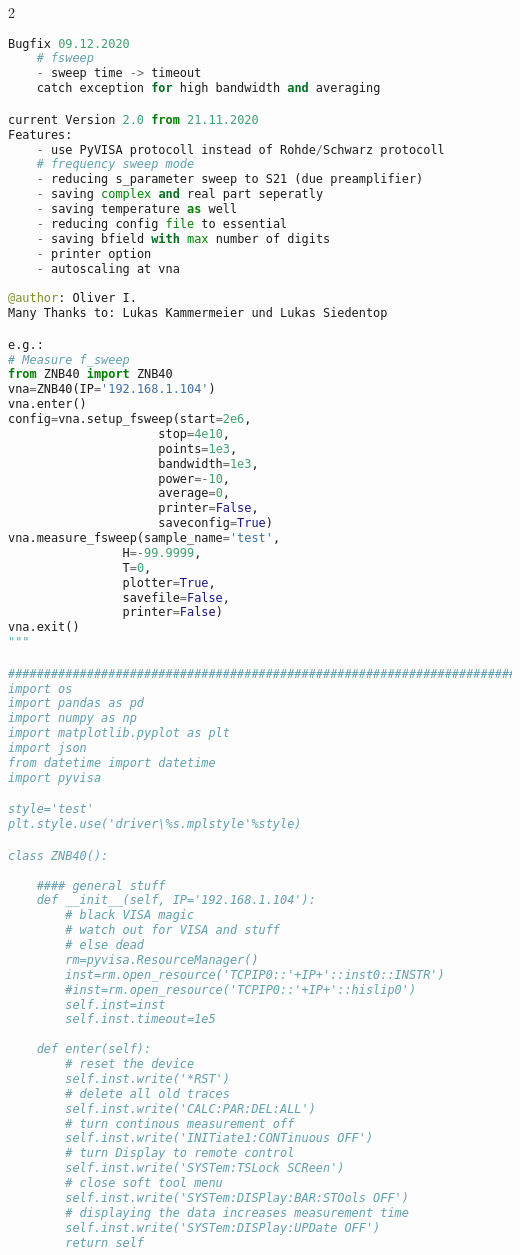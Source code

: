 \begin{landscape}
\begin{multicols}{2}
\begin{lstlisting}[language=Python]
Bugfix 09.12.2020
    # fsweep
    - sweep time -> timeout
    catch exception for high bandwidth and averaging

current Version 2.0 from 21.11.2020
Features:
    - use PyVISA protocoll instead of Rohde/Schwarz protocoll
    # frequency sweep mode
    - reducing s_parameter sweep to S21 (due preamplifier)
    - saving complex and real part seperatly
    - saving temperature as well
    - reducing config file to essential
    - saving bfield with max number of digits
    - printer option
    - autoscaling at vna
    
@author: Oliver I.
Many Thanks to: Lukas Kammermeier und Lukas Siedentop

e.g.:
# Measure f_sweep
from ZNB40 import ZNB40
vna=ZNB40(IP='192.168.1.104')
vna.enter()
config=vna.setup_fsweep(start=2e6,
                     stop=4e10,
                     points=1e3,
                     bandwidth=1e3,
                     power=-10,
                     average=0,
                     printer=False,
                     saveconfig=True)
vna.measure_fsweep(sample_name='test',
                H=-99.9999,
                T=0,
                plotter=True,
                savefile=False,
                printer=False)
vna.exit()
"""

##############################################################################
import os
import pandas as pd
import numpy as np
import matplotlib.pyplot as plt
import json
from datetime import datetime
import pyvisa

style='test'
plt.style.use('driver\%s.mplstyle'%style)

class ZNB40():
    
    #### general stuff
    def __init__(self, IP='192.168.1.104'):
        # black VISA magic
        # watch out for VISA and stuff
        # else dead
        rm=pyvisa.ResourceManager()
        inst=rm.open_resource('TCPIP0::'+IP+'::inst0::INSTR')
        #inst=rm.open_resource('TCPIP0::'+IP+'::hislip0')
        self.inst=inst
        self.inst.timeout=1e5
        
    def enter(self):
        # reset the device
        self.inst.write('*RST')
        # delete all old traces
        self.inst.write('CALC:PAR:DEL:ALL')
        # turn continous measurement off
        self.inst.write('INITiate1:CONTinuous OFF')
        # turn Display to remote control
        self.inst.write('SYSTem:TSLock SCReen')
        # close soft tool menu
        self.inst.write('SYSTem:DISPlay:BAR:STOols OFF')
        # displaying the data increases measurement time 
        self.inst.write('SYSTem:DISPlay:UPDate OFF')
        return self
    

\end{lstlisting}
\end{multicols}
\end{landscape}
